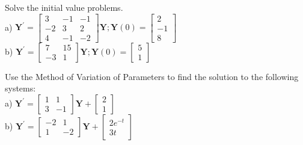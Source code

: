 \documentclass[12pt,letterpaper, onecolumn]{exam}
\begin{document}
\begin{questions}
    \question[4 Marks] Solve the initial value problems. \\
             a) $\mathbf{Y}^{'} = \begin{bmatrix} 3 & -1 & -1 \\ -2 & 3 & 2 \\ 4 & -1 & -2 \end{bmatrix} \mathbf{Y}; \mathbf{Y}(0) = \begin{bmatrix} 2 \\ -1 \\ 8 \end{bmatrix}$ \\
             b) $\mathbf{Y}^{'} = \begin{bmatrix} 7 & 15 \\ -3 & 1 \end{bmatrix} \mathbf{Y}; \mathbf{Y}(0) = \begin{bmatrix} 5 \\ 1 \end{bmatrix}$
    \droppoints
    
    \question[4 Marks] Use the Method of Variation of Parameters to find the solution to the following systems: \\
             a) $\mathbf{Y}^{'} = \begin{bmatrix} 1 & 1 \\ 3 & -1 \end{bmatrix} \mathbf{Y} + \begin{bmatrix} 2 \\ 1 \end{bmatrix}$ \\
             b) $\mathbf{Y}^{'} = \begin{bmatrix} -2 & 1 \\ 1 & -2 \end{bmatrix} \mathbf{Y} + \begin{bmatrix} 2 e^{-t} \\ 3t \end{bmatrix}$
    \droppoints
    

\end{questions}
\end{document}
